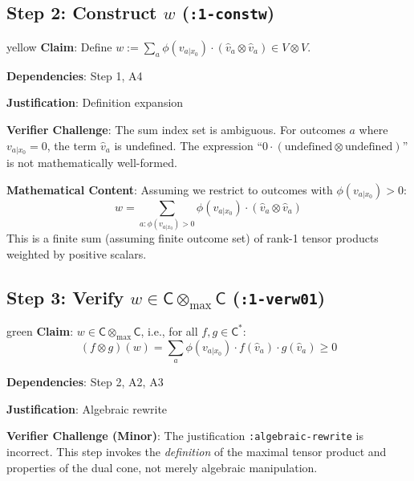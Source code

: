 \documentclass[11pt,a4paper]{article}
\theoremstyle{definition}
\newcommand{\C}{\mathsf{C}}
\newcommand{\Cstar}{\mathsf{C}^*}
\newcommand{\tmax}{\otimes_{\max}}
\begin{document}
\subsection{Step 2: Construct $w$ (\texttt{:1-constw})}

\begin{statusbox}{yellow}
\textbf{Claim}: Define $w := \sum_a \phi(v_{a|x_0}) \cdot (\hat{v}_a \otimes \hat{v}_a) \in V \otimes V$.

\textbf{Dependencies}: Step 1, A4

\textbf{Justification}: Definition expansion
\end{statusbox}

\begin{challengebox}
\textbf{Verifier Challenge}: The sum index set is ambiguous. For outcomes $a$ where $v_{a|x_0} = 0$, the term $\hat{v}_a$ is undefined. The expression ``$0 \cdot (\text{undefined} \otimes \text{undefined})$'' is not mathematically well-formed.
\end{challengebox}

\textbf{Mathematical Content}: Assuming we restrict to outcomes with $\phi(v_{a|x_0}) > 0$:
\[
w = \sum_{a: \phi(v_{a|x_0}) > 0} \phi(v_{a|x_0}) \cdot (\hat{v}_a \otimes \hat{v}_a)
\]
This is a finite sum (assuming finite outcome set) of rank-1 tensor products weighted by positive scalars.

\subsection{Step 3: Verify $w \in \C \tmax \C$ (\texttt{:1-verw01})}

\begin{statusbox}{green}
\textbf{Claim}: $w \in \C \tmax \C$, i.e., for all $f, g \in \Cstar$:
\[
(f \otimes g)(w) = \sum_a \phi(v_{a|x_0}) \cdot f(\hat{v}_a) \cdot g(\hat{v}_a) \geq 0
\]

\textbf{Dependencies}: Step 2, A2, A3

\textbf{Justification}: Algebraic rewrite
\end{statusbox}

\begin{challengebox}
\textbf{Verifier Challenge (Minor)}: The justification \texttt{:algebraic-rewrite} is incorrect. This step invokes the \emph{definition} of the maximal tensor product and properties of the dual cone, not merely algebraic manipulation.
\end{challengebox}
\end{document}
